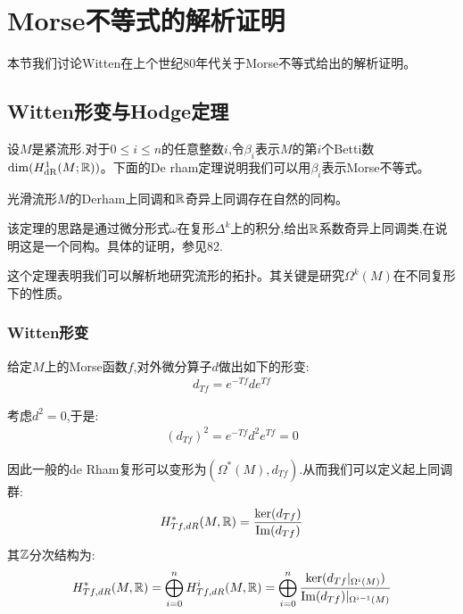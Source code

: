 \ifx\allfiles\undefined

\else
\fi
\chapter{Morse不等式的解析证明}
本节我们讨论Witten在上个世纪80年代关于Morse不等式给出的解析证明。%
\section{Witten形变与Hodge定理}
设$M$是紧流形.对于$0\leq  i\leq n$的任意整数$i$,令$\beta_i$表示$M$的第$i$个Betti数$\dim (H_{\mathrm{dR}}^1(M;\mathbb{R}))$。下面的De rham定理说明我们可以用$\beta_i$表示Morse不等式。
\begin{theorem}[De rham定理]
	光滑流形$M$的Derham上同调和$\mathbb{R}$奇异上同调存在自然的同构。
\end{theorem}
该定理的思路是通过微分形式$\omega$在复形$\Delta^k$上的积分,给出$\mathbb{R}$系数奇异上同调类,在说明这是一个同构。具体的证明，参见82.

这个定理表明我们可以解析地研究流形的拓扑。其关键是研究$\Omega^k(M)$在不同复形下的性质。

\subsection{Witten形变}
给定$M$上的Morse函数$f$,对外微分算子$d$做出如下的形变:
\begin{align}
	d_{Tf}=e^{-Tf}d e^{Tf}
\end{align}

考虑$d^2=0$,于是:
\begin{align*}
	(d_{Tf})^2=e^{-Tf}d^2 e^{Tf}=0
\end{align*}

因此一般的de Rham复形可以变形为$(\Omega^*(M),d_{Tf})$.从而我们可以定义起上同调群:
\begin{align*}
	H_{Tf,dR}^*(M,\mathbb{R})=\frac{\ker(d_{Tf})}{\mathrm{Im}(d_{Tf})}
\end{align*}
其$\mathbb{Z}$分次结构为:
\begin{align*}
	H_{Tf,dR}^*(M,\mathbb{R})=\bigoplus_{i=0}^n H_{Tf,dR}^i(M,\mathbb{R})=\bigoplus_{i=0}^n \frac{\ker(d_{Tf}|_{\Omega^i(M)})}{\mathrm{Im}(d_{Tf})|_{\Omega^{i-1}(M)}}
\end{align*}

